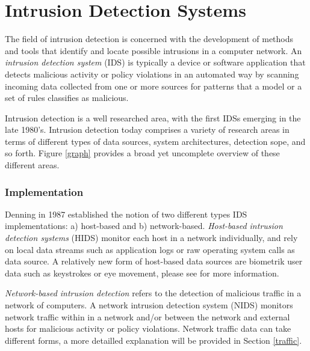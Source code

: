\documentclass[a4paper,12pt,twoside]{report}
\begin{document}
\section{Intrusion Detection Systems}

The field of intrusion detection is concerned with the development of methods and tools that identify and locate possible intrusions in a computer network. An \textit{intrusion detection system} (IDS) is typically a device or software application that detects malicious activity or policy violations in an automated way by scanning incoming data collected from one or more sources for patterns that a model or a set of rules classifies as malicious.

Intrusion detection is a well researched area, with the first IDSs emerging in the late 1980's. Intrusion detection today comprises a variety of research areas in terms of different types of data sources, system architectures, detection sope, and so forth. Figure \ref{graph} provides a broad yet uncomplete overview of these different areas. 


\subsubsection*{Implementation}

Denning \cite{denning1987intrusion} in 1987 established the notion of two different types IDS implementations: a) host-based and b) network-based. 
\textit{Host-based intrusion detection systems} (HIDS) monitor each host in a network individually, and rely on local data streams such as application logs or raw operating system calls as  data source. A relatively new form of host-based data sources are biometrik user data such as keystrokes or eye movement, please see \cite{peng_user_2016} for more information.

\textit{Network-based intrusion detection} refers to the detection of malicious traffic in a network of computers. A network intrusion detection system (NIDS) monitors network traffic within in a network and/or between the network and external hosts for malicious activity or policy violations. Network traffic data can take different forms, a more detailled explanation will be provided in Section \ref{traffic}.
\end{document}
